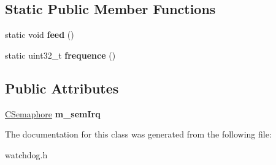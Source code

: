 \subsection*{Static Public Member Functions}
\begin{DoxyCompactItemize}
\item 
\hypertarget{class_c_watchdog_a34f816a6e2a53dc92943e9c309244130}{static void {\bfseries feed} ()}\label{class_c_watchdog_a34f816a6e2a53dc92943e9c309244130}

\item 
\hypertarget{class_c_watchdog_a231300cd97144342d7d3d9606cb9b60c}{static uint32\-\_\-t {\bfseries frequence} ()}\label{class_c_watchdog_a231300cd97144342d7d3d9606cb9b60c}

\end{DoxyCompactItemize}
\subsection*{Public Attributes}
\begin{DoxyCompactItemize}
\item 
\hypertarget{class_c_watchdog_afac017788a234968c352f037ebb77649}{\hyperlink{class_c_semaphore}{C\-Semaphore} {\bfseries m\-\_\-sem\-Irq}}\label{class_c_watchdog_afac017788a234968c352f037ebb77649}

\end{DoxyCompactItemize}


The documentation for this class was generated from the following file\-:\begin{DoxyCompactItemize}
\item 
watchdog.\-h\end{DoxyCompactItemize}
